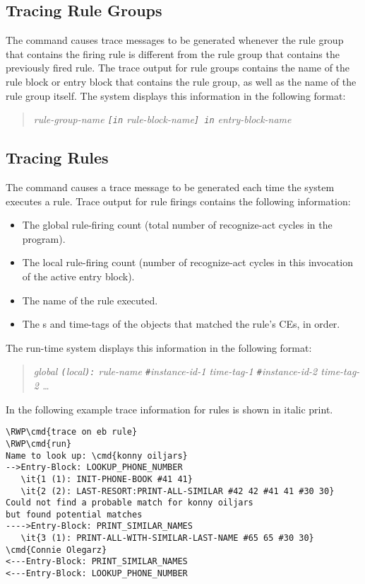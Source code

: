 \subsection{Tracing Rule Groups}

The  command causes trace messages to be generated
whenever the rule group that contains the firing rule is different
from the rule group that contains the previously fired rule. The trace
output for rule groups contains the name of the rule block or entry
block that contains the rule group, as well as the name of the rule
group itself. The system displays this information in the following
format:

\begin{quote}
   \it{rule-group-name} \verb|[in| \it{rule-block-name}\verb|] in|
  \it{entry-block-name}
\end{quote}

\subsection{Tracing Rules}

The  command causes a trace message to be generated
each time the system executes a rule. Trace output for rule
firings contains the following information:

\begin{itemize}
\item The global rule-firing count (total number of recognize-act
  cycles in the program).
\item The local rule-firing count (number of recognize-act cycles in
  this invocation of the active entry block).
\item The name of the rule executed.
\item The s and time-tags of the objects that matched the
  rule's CEs, in order.
\end{itemize}
  
The run-time system displays this information in the following format:

\begin{quote}
  \it{global} \verb|(|\it{local}\verb|):| \it{rule-name}
  \verb|#|\it{instance-id-1} \it{time-tag-1}
  \verb|#|\it{instance-id-2} \it{time-tag-2} \ldots
\end{quote}

In the following example trace information for rules is shown in
italic print.

\begin{Verbatim}[commandchars=\\\{\}]
\RWP\cmd{trace on eb rule}
\RWP\cmd{run}
Name to look up: \cmd{konny oiljars}
-->Entry-Block: LOOKUP_PHONE_NUMBER
   \it{1 (1): INIT-PHONE-BOOK #41 41}
   \it{2 (2): LAST-RESORT:PRINT-ALL-SIMILAR #42 42 #41 41 #30 30}
Could not find a probable match for konny oiljars
but found potential matches
---->Entry-Block: PRINT_SIMILAR_NAMES
   \it{3 (1): PRINT-ALL-WITH-SIMILAR-LAST-NAME #65 65 #30 30}
\cmd{Connie Olegarz}
<---Entry-Block: PRINT_SIMILAR_NAMES
<---Entry-Block: LOOKUP_PHONE_NUMBER
\end{Verbatim}

